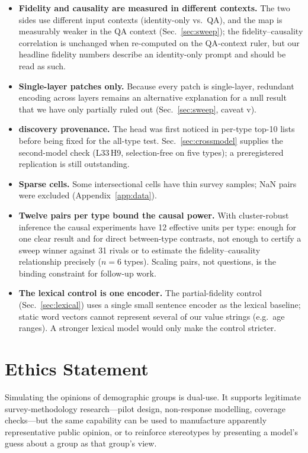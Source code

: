 \begin{itemize}
        counterexamples, but not enough to generalize to intersections
        outside this set.
  \item \textbf{Fidelity and causality are measured in different
        contexts.} The two sides use different input contexts
        (identity-only vs.\ QA), and the map is measurably weaker in the
        QA context (Sec.~\ref{sec:sweep}); the fidelity--causality
        correlation is unchanged when re-computed on the QA-context
        ruler, but our headline fidelity numbers describe an
        identity-only prompt and should be read as such.
  \item \textbf{Single-layer patches only.} Because every patch is
        single-layer, redundant encoding across layers remains an
        alternative explanation for a null result that we have only
        partially ruled out (Sec.~\ref{sec:sweep}, caveat v).
  \item \textbf{\starhead{} discovery provenance.} The head was first
        noticed in per-type top-10 lists before being fixed for the
        all-type test. Sec.~\ref{sec:crossmodel} supplies the
        second-model check (L33\,H9, selection-free on five types); a
        preregistered replication is still outstanding.
  \item \textbf{Sparse cells.} Some intersectional cells have thin survey
        samples; NaN pairs were excluded (Appendix~\ref{app:data}).
  \item \textbf{Twelve pairs per type bound the causal power.} With
        cluster-robust inference the causal experiments have 12 effective
        units per type: enough for one clear result and for direct
        between-type contrasts, not enough to certify a sweep winner
        against 31 rivals or to estimate the fidelity--causality
        relationship precisely ($n{=}6$ types). Scaling pairs, not
        questions, is the binding constraint for follow-up work.
  \item \textbf{The lexical control is one encoder.} The partial-fidelity
        control (Sec.~\ref{sec:lexical}) uses a single small sentence
        encoder as the lexical baseline; static word vectors cannot
        represent several of our value strings (e.g.\ age ranges). A
        stronger lexical model would only make the control stricter.
\end{itemize}

\section*{Ethics Statement}
Simulating the opinions of demographic groups is dual-use. It supports
legitimate survey-methodology research---pilot design, non-response
modelling, coverage checks---but the same capability can be used to
manufacture apparently representative public opinion, or to reinforce
stereotypes by presenting a model's guess about a group as that group's
view.

